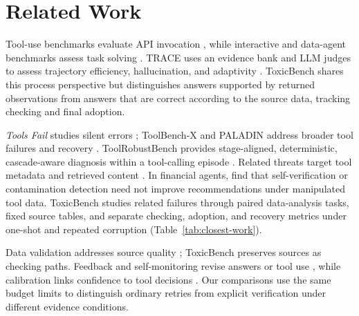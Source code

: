 \section{Related Work}
\label{sec:related}

Tool-use benchmarks evaluate API invocation \citep{qin2023toolllm,li2023apibank,patil2024gorilla}, while interactive and data-agent benchmarks assess task solving \citep{liu2023agentbench,zhou2023webarena,lei2025dacomp}. TRACE uses an evidence bank and LLM judges to assess trajectory efficiency, hallucination, and adaptivity \citep{kim2025trace}. ToxicBench shares this process perspective but distinguishes answers supported by returned observations from answers that are correct according to the source data, tracking checking and final adoption.

\emph{Tools Fail} studies silent errors \citep{sun2024toolsfail}; ToolBench-X and PALADIN address broader tool failures and recovery \citep{tian2026toolbenchx,vuddanti2025paladin}. ToolRobustBench provides stage-aligned, deterministic, cascade-aware diagnosis within a tool-calling episode \citep{zheng2026toolrobustbench}. Related threats target tool metadata \citep{li2026mcpitp,ye2026trustdesc} and retrieved content \citep{zou2024poisonedrag,liang2025saferag}. In financial agents, \citet{wu2026agentdrift} find that self-verification or contamination detection need not improve recommendations under manipulated tool data. ToxicBench studies related failures through paired data-analysis tasks, fixed source tables, and separate checking, adoption, and recovery metrics under one-shot and repeated corruption (Table~\ref{tab:closest-work}).

Data validation addresses source quality \citep{schelter2018automating,breck2019data,gu2025radar}; ToxicBench preserves sources as checking paths. Feedback and self-monitoring revise answers or tool use \citep{shinn2023reflexion,madaan2023selfrefine,zhou2024metarag,hamad2025toolcritic}, while calibration links confidence to tool decisions \citep{xuan2026confidence,subramani2025mice}. Our comparisons use the same budget limits to distinguish ordinary retries from explicit verification under different evidence conditions.
